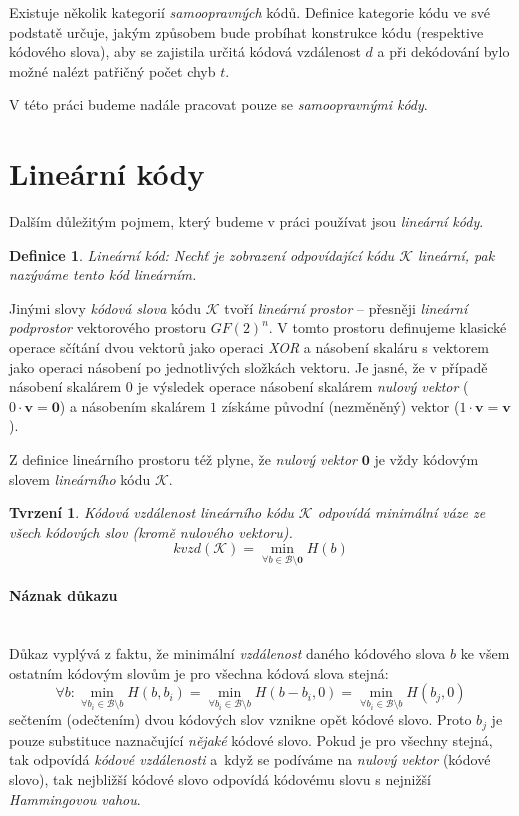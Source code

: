\documentclass[thesis=M,czech,hidelinks]{FITthesis}[2012/06/26]
\newcommand{\0}{{\textcolor[gray]{0.80}{0}}}
\newtheorem{tvrzeni}{Tvrzení}
\newtheorem{definice}{Definice}
\begin{document}
Existuje několik kategorií \emph{samoopravných} kódů. Definice kategorie kódu ve
své podstatě určuje, jakým způsobem bude probíhat konstrukce kódu (respektive
kódového slova), aby se zajistila určitá kódová vzdálenost $d$ a při dekódování
bylo možné nalézt patřičný počet chyb $t$.

V této práci budeme nadále pracovat pouze se \emph{samoopravnými kódy}.



\section{Lineární kódy}\label{kap_linearni_kody}
Dalším důležitým pojmem, který budeme v práci používat jsou \emph{lineární
kódy}.

\begin{definice}{Lineární kód:}
    Nechť je zobrazení odpovídající kódu $\mathcal{K}$ \emph{lineární},
    pak nazýváme tento kód \emph{lineárním}.
\end{definice}

Jinými slovy \emph{kódová slova} kódu $\mathcal{K}$ tvoří \emph{lineární
prostor} -- přesněji \emph{lineární podprostor} vektorového prostoru $GF(2)^n$.
V tomto prostoru definujeme klasické operace sčítání dvou vektorů jako operaci
\emph{XOR} a násobení skaláru s vektorem jako operaci násobení po jednotlivých
složkách vektoru. Je jasné, že v případě násobení skalárem $0$ je výsledek
operace násobení skalárem \emph{nulový vektor} ($0 \cdot \mathbf{v} = \mathbf{0}$)
a násobením skalárem $1$ získáme původní (nezměněný) vektor
($1 \cdot \mathbf{v} = \mathbf{v}$).

Z definice lineárního prostoru též plyne, že \emph{nulový vektor} $\mathbf{0}$
je vždy kódovým slovem \emph{lineárního} kódu $\mathcal{K}$.

\begin{tvrzeni}
    Kódová vzdálenost lineárního kódu $\mathcal{K}$ odpovídá minimální váze ze
    všech kódových slov (kromě nulového vektoru).
    $$
        kvzd(\mathcal{K}) =
        \min_{\forall b \in \mathcal{B} \setminus \mathbf{0}} H(b)
    $$
\end{tvrzeni}

\paragraph{Náznak důkazu} \hfil \\
Důkaz vyplývá z faktu, že minimální \emph{vzdálenost} daného kódového slova $b$
ke všem ostatním kódovým slovům je pro všechna kódová slova stejná:
$$
    \forall b :
    \min_{\forall b_i \in \mathcal{B} \setminus b} H( b,     b_i ) =
    \min_{\forall b_i \in \mathcal{B} \setminus b} H( b-b_i, 0   ) =
    \min_{\forall b_i \in \mathcal{B} \setminus b} H( b_j,   0   )
$$
sečtením (odečtením) dvou kódových slov vznikne opět kódové slovo. Proto $b_j$
je pouze substituce naznačující \emph{nějaké} kódové slovo. Pokud je pro všechny
stejná, tak odpovídá \emph{kódové vzdálenosti} a~když se podíváme na
\emph{nulový vektor} (kódové slovo), tak nejbližší kódové slovo odpovídá
kódovému slovu s nejnižší \emph{Hammingovou vahou}.
\end{document}
